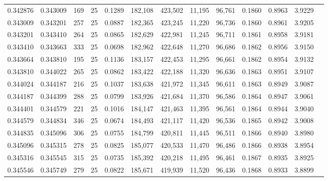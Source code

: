 \begin{tabular}{rrrrrrrrrrrrr}
0.342876 & 0.343009 &   169 &  25 &                                     0.1289 & 182,108 & 423,502 &  11,195 &  96,761 & 0.1860 & 0.8963 & 3.9229 \\
0.343009 & 0.343201 &   257 &  25 &                                     0.0887 & 182,365 & 423,245 &  11,220 &  96,736 & 0.1860 & 0.8961 & 3.9205 \\
0.343201 & 0.343410 &   264 &  25 &                                     0.0865 & 182,629 & 422,981 &  11,245 &  96,711 & 0.1861 & 0.8958 & 3.9181 \\
0.343410 & 0.343663 &   333 &  25 &                                     0.0698 & 182,962 & 422,648 &  11,270 &  96,686 & 0.1862 & 0.8956 & 3.9150 \\
0.343664 & 0.343810 &   195 &  25 &                                     0.1136 & 183,157 & 422,453 &  11,295 &  96,661 & 0.1862 & 0.8954 & 3.9132 \\
0.343810 & 0.344022 &   265 &  25 &                                     0.0862 & 183,422 & 422,188 &  11,320 &  96,636 & 0.1863 & 0.8951 & 3.9107 \\
0.344024 & 0.344187 &   216 &  25 &                                     0.1037 & 183,638 & 421,972 &  11,345 &  96,611 & 0.1863 & 0.8949 & 3.9087 \\
0.344187 & 0.344399 &   288 &  25 &                                     0.0799 & 183,926 & 421,684 &  11,370 &  96,586 & 0.1864 & 0.8947 & 3.9061 \\
0.344401 & 0.344579 &   221 &  25 &                                     0.1016 & 184,147 & 421,463 &  11,395 &  96,561 & 0.1864 & 0.8944 & 3.9040 \\
0.344579 & 0.344834 &   346 &  25 &                                     0.0674 & 184,493 & 421,117 &  11,420 &  96,536 & 0.1865 & 0.8942 & 3.9008 \\
0.344835 & 0.345096 &   306 &  25 &                                     0.0755 & 184,799 & 420,811 &  11,445 &  96,511 & 0.1866 & 0.8940 & 3.8980 \\
0.345096 & 0.345315 &   278 &  25 &                                     0.0825 & 185,077 & 420,533 &  11,470 &  96,486 & 0.1866 & 0.8938 & 3.8954 \\
0.345316 & 0.345545 &   315 &  25 &                                     0.0735 & 185,392 & 420,218 &  11,495 &  96,461 & 0.1867 & 0.8935 & 3.8925 \\
0.345546 & 0.345749 &   279 &  25 &                                     0.0822 & 185,671 & 419,939 &  11,520 &  96,436 & 0.1868 & 0.8933 & 3.8899 \\

\end{tabular}
